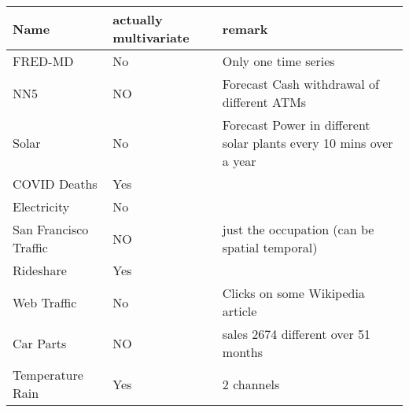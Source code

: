 \begin{table}
\begin{tabular}{lll}
	\toprule
	Name & actually multivariate & remark
\\	\midrule
	FRED-MD & No & Only one time series
\\	NN5  & NO & Forecast Cash withdrawal of different ATMs
\\	Solar & No & Forecast Power in different solar plants every 10 mins over a year
\\	COVID Deaths & Yes
\\	Electricity & No
\\	San Francisco Traffic & NO & just the occupation (can be spatial temporal)
\\	Rideshare & Yes
\\	Web Traffic	& No & Clicks on some Wikipedia article
\\	Car Parts & NO & sales 2674 different over 51 months
\\	Temperature Rain & Yes & 2 channels
\\	\bottomrule
\end{tabular}
\end{table}
